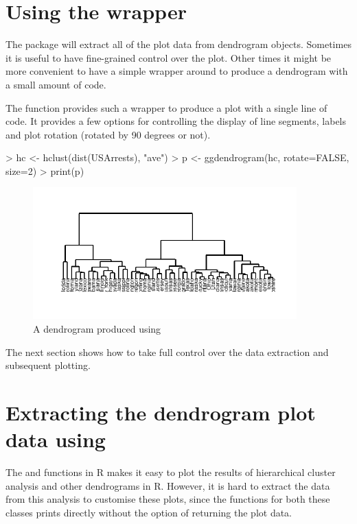 \documentclass[10pt,oneside]{article}
\begin{document}
\section{Using the  wrapper}

The \ggdendro{} package will extract all of the plot data from dendrogram objects.  Sometimes it is useful to have fine-grained control over the plot.  Other times it might be more convenient to have a simple wrapper around  to produce a dendrogram with a small amount of code.

The function  provides such a wrapper to produce a plot with a single line of code.  It provides a few options for controlling the display of line segments, labels and plot rotation (rotated by 90 degrees or not).  

\begin{Schunk}
\begin{Sinput}
> hc <- hclust(dist(USArrests), "ave")
> p <- ggdendrogram(hc, rotate=FALSE, size=2)
> print(p)
\end{Sinput}
\end{Schunk}

\begin{figure}[h]
\begin{center}
\includegraphics[width=4in, height=2in]{ggdendro-dendrogram}
\end{center}
\caption{A dendrogram produced using }
\end{figure}

The next section shows how to take full control over the data extraction and subsequent plotting.

\section{Extracting the dendrogram plot data using \dendrodata{}}

The  and  functions in R makes it easy to plot the results of hierarchical cluster analysis and other dendrograms in R.  However, it is hard to extract the data from this analysis to customise these plots, since the  functions for both these classes prints directly without the option of returning the plot data.  
\end{document}
